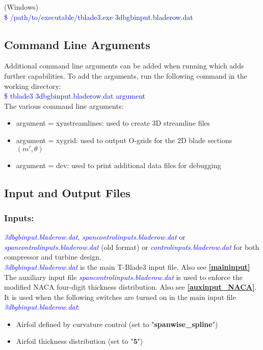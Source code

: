 \documentclass[8pt]{article}
\begin{document}
\noindent
(Windows)\\
\textcolor{blue}{{\selectfont \$ /path/to/executable/tblade3.exe 3dbgbinput.bladerow.dat}}

\subsection{Command Line Arguments}\label{cmdargs}
\noindent
Additional command line arguments can be added when running which adds further capabilities. To add the arguments, run the following command in the working directory:\\

\noindent
\textcolor{blue}{{\selectfont \$ tblade3 3dbgbinput.bladerow.dat argument}}\\

\noindent
The various command line arguments:
\begin{itemize}[leftmargin=*]
    \item argument = {\selectfont xyzstreamlines}: used to create 3D streamline files
    \item argument = {\selectfont xygrid}: used to output O-grids for the 2D blade sections $(m',\theta)$
    \item argument = {\selectfont dev}: used to print additional data files for debugging
\end{itemize}

\subsection{Input and Output Files}\label{inputoutput}
\subsubsection{Inputs:}\label{inputs}
\noindent
\textit{\textcolor{blue}{3dbgbinput.bladerow.dat}}, \textit{\textcolor{blue}{spancontrolinputs.bladerow.dat}} or \textit{\textcolor{blue}{spancontrolinputs.bladerow.dat}} (old format) or \textit{\textcolor{blue}{controlinputs.bladerow.dat}} for both compressor and turbine design.\\

\noindent
\textit{\textcolor{blue}{3dbgbinput.bladerow.dat}} is the main T-Blade3 input file. Also see \textbf{\ref{maininput}}\\ 

\noindent
The auxiliary input file \textit{\textcolor{blue}{spancontrolinputs.bladerow.dat}} is used to enforce the modified NACA four-digit thickness distribution. Also see \textbf{\ref{auxinput_NACA}}. It is used when the following switches are turned on in the main input file \textit{\textcolor{blue}{3dbgbinput.bladerow.dat}}:
\begin{itemize}
    \item Airfoil defined by curvature control (set to "\textbf{spanwise\_spline}")
    \item Airfoil thickness distribution (set to "$\mathbf{5}$")
\end{itemize}
\end{document}
